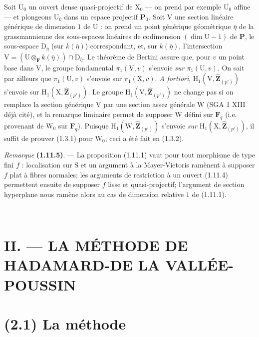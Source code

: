 \documentclass[11pt,leqno]{article}
\newcommand{\Page}[1]{\ifvmode\noindent\else\unskip\ \fi{\footnotesize\textcolor{gray}{[p.\,#1]}}\ \ignorespaces}
\begin{document}
Soit \(\mathrm{U}_0\) un ouvert dense quasi-projectif de \(\mathrm{X}_0\) — on prend par exemple \(\mathrm{U}_0\) affine — et plongeons \(\mathrm{U}_0\) dans un espace projectif \(\mathbf{P}_0\). Soit \(\mathrm{V}\) une section linéaire générique de dimension \(1\) de \(\mathrm{U}\) : on prend un point générique géométrique \(\bar{\eta}\) de la grassmannienne des sous-espaces linéaires de codimension \((\dim\mathrm{U}-1)\) de \(\mathbf{P}\), le sous-espace \(\mathrm{D}_{\bar{\eta}}\) (sur \(k(\bar{\eta})\)) correspondant, et, sur \(k(\bar{\eta})\), l’intersection \(\mathrm{V}=(\mathrm{U}\otimes_{\mathbf{F}}k(\bar{\eta}))\cap\mathrm{D}_{\bar{\eta}}\). Le théorème de Bertini assure que, pour \(v\) un point base dans \(\mathrm{V}\), le groupe fondamental \(\pi_1(\mathrm{V},v)\) s’envoie \textit{sur} \(\pi_1(\mathrm{U},v)\). On sait par ailleurs que \(\pi_1(\mathrm{U},v)\) s’envoie sur \(\pi_1(\mathrm{X},v)\). \textit{A fortiori}, \(\mathrm{H}_1(\mathrm{V},\widehat{\mathbf{Z}}_{(p')})\) s’envoie sur \(\mathrm{H}_1(\mathrm{X},\widehat{\mathbf{Z}}_{(p')})\). Le groupe \(\mathrm{H}_1(\mathrm{V},\widehat{\mathbf{Z}}_{(p')})\) ne change pas si on remplace la section générique \(\mathrm{V}\) par une section assez générale \(\mathrm{W}\) (SGA 1 XIII déjà cité), et la remarque liminaire permet de supposer \(\mathrm{W}\) défini sur \(\mathbf{F}_q\) (i.e. provenant de \(\mathrm{W}_0\) sur \(\mathbf{F}_q\)). Puisque \(\mathrm{H}_1(\mathrm{W},\widehat{\mathbf{Z}}_{(p')})\) s’envoie \textit{sur} \(\mathrm{H}_1(\mathrm{X},\widehat{\mathbf{Z}}_{(p')})\), il suffit de prouver (1.3.1) pour \(\mathrm{W}_0\); ceci a été fait en (1.3.2).

\textit{Remarque} \textbf{(1.11.5)}. — La proposition (1.11.1) vaut pour tout morphisme de type fini \(f\) : localisation sur \(\mathrm{S}\) et un argument à la Mayer-Vietoris ramènent à supposer \(f\) plat à fibres normales; les arguments de restriction à un ouvert (1.11.4) permettent ensuite de supposer \(f\) lisse et quasi-projectif; l’argument de section hyperplane nous ramène alors au cas de dimension relative \(1\) de (1.11.1).

\Page{187}
\section*{II. — LA MÉTHODE DE HADAMARD-DE LA VALLÉE-POUSSIN}

\section*{(2.1) La méthode}
\end{document}
